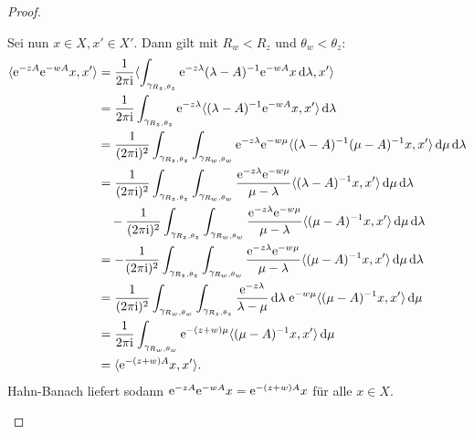\begin{proof}
\begin{enumerate}[(i)]
      Sei nun $x \in X, x' \in X'$.
      Dann gilt mit $R_w < R_z$ und $\theta_w < \theta_z$:
      \begin{align*}
        \langle \e^{-zA} \e^{-wA} x, x' \rangle
        &= \frac{1}{2\pi \ii} \langle \int_{\gamma_{R_z, \theta_z}} \e^{-z\lambda} (\lambda - A)^{-1} \e^{-wA} x \d \lambda, x' \rangle \\
        &= \frac{1}{2\pi \ii} \int_{\gamma_{R_z, \theta_z}} \e^{-z\lambda} \langle (\lambda - A)^{-1} \e^{-wA} x, x' \rangle \d \lambda\\
        &= \frac{1}{(2\pi \ii)^2} \int_{\gamma_{R_z, \theta_z}} \int_{\gamma_{R_w, \theta_w}}  \e^{-z\lambda} \e^{-w \mu} \langle (\lambda - A)^{-1} (\mu - A)^{-1} x, x' \rangle \d \mu \d \lambda\\
        &= \frac{1}{(2\pi \ii)^2} \int_{\gamma_{R_z, \theta_z}} \int_{\gamma_{R_w, \theta_w}}  \frac{\e^{-z\lambda} \e^{-w \mu}}{\mu - \lambda} \langle (\lambda - A)^{-1} x, x' \rangle \d \mu \d \lambda\\
        &\quad - \frac{1}{(2\pi \ii)^2} \int_{\gamma_{R_z, \theta_z}} \int_{\gamma_{R_w, \theta_w}}  \frac{\e^{-z\lambda} \e^{-w \mu}}{\mu - \lambda} \langle (\mu - A)^{-1} x, x' \rangle \d \mu \d \lambda\\
        &= - \frac{1}{(2\pi \ii)^2} \int_{\gamma_{R_z, \theta_z}} \int_{\gamma_{R_w, \theta_w}}  \frac{\e^{-z\lambda} \e^{-w \mu}}{\mu - \lambda} \langle (\mu - A)^{-1} x, x' \rangle \d \mu \d \lambda\\
        &= \frac{1}{(2\pi \ii)^2} \int_{\gamma_{R_w, \theta_w}} \int_{\gamma_{R_z, \theta_z}}  \frac{\e^{-z\lambda} }{\lambda - \mu}\d \lambda \; \e^{-w \mu} \langle (\mu - A)^{-1} x, x' \rangle \d \mu \\
        &= \frac{1}{2\pi \ii} \int_{\gamma_{R_w, \theta_w}} \e^{-(z+ w)\mu}\langle (\mu - A)^{-1} x, x' \rangle \d \mu\\
        &= \langle \e^{-(z + w)A} x, x' \rangle.
      \end{align*}
      Hahn-Banach liefert sodann $\mathrm{e}^{-zA}\mathrm{e}^{-wA} x = \mathrm{e}^{-(z + w)A}x$ für alle $x \in X$. 


\end{enumerate}
\end{proof}
